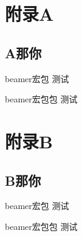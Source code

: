 \documentclass[hyperref, UTF8, CJK, aspectratio=169]{beamer}
\begin{document}
\appendix
\section{附录A}
\subsection[short]{A那你}
\begin{frame}{beamer宏包}\label{frame:abc}
	测试
\end{frame}

\begin{frame}{beamer宏包包}\label{frame:adc}
	测试
\end{frame}

\section{附录B}
\subsection[short]{B那你}
\begin{frame}{beamer宏包}\label{frame:abd}
	测试
\end{frame}

\begin{frame}{beamer宏包包}\label{frame:add}
	测试
\end{frame}
\end{document}
